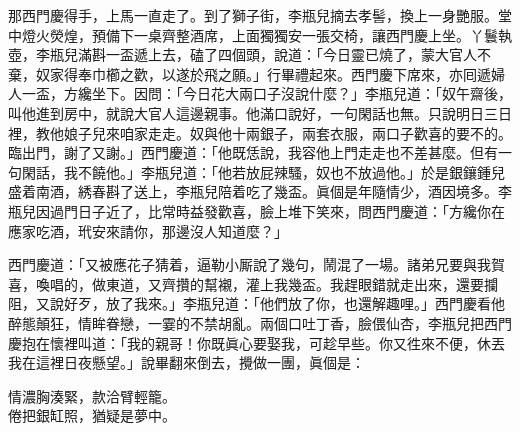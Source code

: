 那西門慶得手，上馬一直走了。到了獅子街，李瓶兒摘去孝髻，換上一身艷服。堂中燈火熒煌，預備下一桌齊整酒席，{}上面獨獨安一張交椅，讓西門慶上坐。丫鬟執壺，李瓶兒滿斟一盃遞上去，磕了四個頭，說道：「今日靈已燒了，蒙大官人不棄，奴家得奉巾櫛之歡，以遂於飛之願。」行畢禮起來。西門慶下席來，亦囘遞婦人一盃，方纔坐下。因問：「今日花大兩口子沒說什麼？」{}李瓶兒道：「奴午齋後，叫他進到房中，就說大官人這邊親事。他滿口說好，一句閑話也無。只說明日三日裡，教他娘子兒來咱家走走。奴與他十兩銀子，兩套衣服，兩口子歡喜的要不的。臨出門，謝了又謝。」西門慶道：「他既恁說，我容他上門走走也不差甚麼。但有一句閑話，我不饒他。」{}李瓶兒道：「他若放屁辣騷，奴也不放過他。」於是銀鑲鍾兒盛着南酒，綉春斟了送上，李瓶兒陪着吃了幾盃。眞個是年隨情少，酒因境多。李瓶兒因過門日子近了，比常時益發歡喜，臉上堆下笑來，問西門慶道：「方纔你在應家吃酒，玳安來請你，那邊沒人知道麼？」

西門慶道：「又被應花子猜着，逼勒小厮說了幾句，鬧混了一場。諸弟兄要與我賀喜，喚唱的，做東道，又齊攢的幫襯，灌上我幾盃。我趕眼錯就走出來，還要攔阻，又說好歹，放了我來。」{}李瓶兒道：「他們放了你，也還解趣哩。」西門慶看他醉態顛狂，情眸眷戀，一霎的不禁胡亂。兩個口吐丁香，臉偎仙杏，李瓶兒把西門慶抱在懷裡叫道：「我的親哥！你既眞心要娶我，可趁早些。{}你又徃來不便，休丟我在這裡日夜懸望。」說畢翻來倒去，攪做一團，眞個是：

\begin{myquote}
情濃胸湊緊，款洽臂輕籠。\\倦把銀缸照，猶疑是夢中。
\end{myquote}

 

